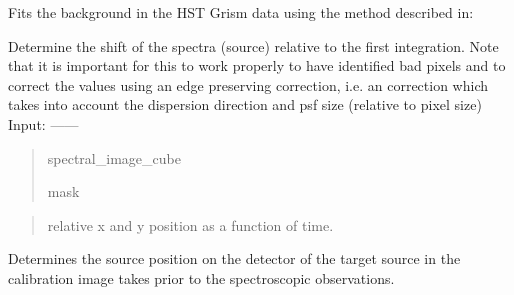 \documentclass[a4paper,11pt,english]{sphinxmanual}
\begin{document}
\begin{fulllineitems}
\begin{fulllineitems}
\label{\detokenize{cascade.instruments:cascade.instruments.instruments.HSTWFC3._fit_background}}
Fits the background in the HST Grism data using the method described
in: 

\end{fulllineitems}


\begin{fulllineitems}
\label{\detokenize{cascade.instruments:cascade.instruments.instruments.HSTWFC3._determine_relative_source_position}}
Determine the shift of the spectra (source) relative to the first
integration. Note that it is important for this to work properly
to have identified bad pixels and to correct the values using an edge
preserving correction, i.e. an correction which takes into account
the dispersion direction and psf size (relative to pixel size)
Input:
——
\begin{quote}

spectral\_image\_cube

mask
\end{quote}
\begin{quote}

relative x and y position as a function of time.
\end{quote}

\end{fulllineitems}


\begin{fulllineitems}
\label{\detokenize{cascade.instruments:cascade.instruments.instruments.HSTWFC3._determine_source_position_from_cal_image}}
Determines the source position on the detector of the target source in
the calibration image takes prior to the spectroscopic observations.


\end{fulllineitems}
\end{fulllineitems}
\end{document}
